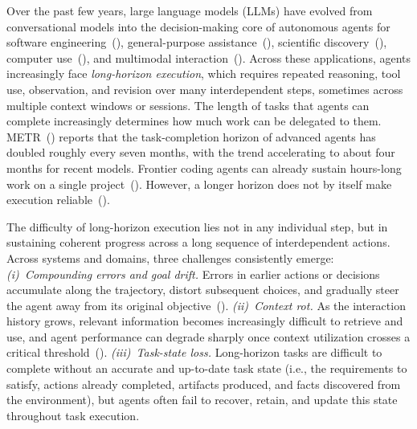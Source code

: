 \documentclass[]{fairmeta}
\renewcommand{\cite}[1]{(\citealp{#1})}
\begin{document}
Over the past few years, large language models (LLMs) have evolved from conversational models into the decision-making core of autonomous agents for software engineering~\cite{sweagent,openhands,ren2026saasbench,ding2025nl2repo}, general-purpose assistance~\cite{claudecode,codex,openai_chatgpt_agent,anthropic_cowork}, scientific discovery~\cite{scientificdiscovery,wei2025ai}, computer use~\cite{anthropic_claude_use,openai_operator,google_gemini_cu,sager2026comprehensive,zhou2026colorbrowseragent,zheng2026code2world}, and multimodal interaction~\cite{multimodal_agent,agents}. Across these applications, agents increasingly face \emph{long-horizon execution}, which requires repeated reasoning, tool use, observation, and revision over many interdependent steps, sometimes across multiple context windows or sessions. The length of tasks that agents can complete increasingly determines how much work can be delegated to them. METR~\cite{longtasks} reports that the task-completion horizon of advanced agents has doubled roughly every seven months, with the trend accelerating to about four months for recent models. Frontier coding agents can already sustain hours-long work on a single project~\cite{codex,claudecode,yang2026programbench}. However, a longer horizon does not by itself make execution reliable~\cite{dong2026longhorizon}.

The difficulty of long-horizon execution lies not in any individual step, but in sustaining coherent progress across a long sequence of interdependent actions. Across systems and domains, three challenges consistently emerge: \textit{(i)~Compounding errors and goal drift.} Errors in earlier actions or decisions accumulate along the trajectory, distort subsequent choices, and gradually steer the agent away from its original objective~\cite{ale}. \textit{(ii)~Context rot.} As the interaction history grows, relevant information becomes increasingly difficult to retrieve and use, and agent performance can degrade sharply once context utilization crosses a critical threshold~\cite{contextlimit1,contextlimit2}. \textit{(iii)~Task-state loss.} Long-horizon tasks are difficult to complete without an accurate and up-to-date task state (i.e., the requirements to satisfy, actions already completed, artifacts produced, and facts discovered from the environment), but agents often fail to recover, retain, and update this state throughout task execution.
\end{document}
